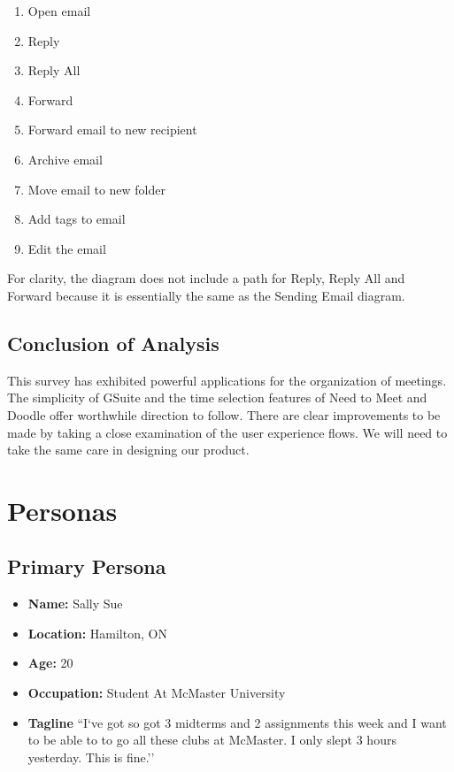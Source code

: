 \documentclass{sigchi}
\begin{document}
\begin{enumerate}
\item Open email
\item Reply
\item Reply All
\item Forward
\item Forward email to new recipient
\item Archive email
\item Move email to new folder
\item Add tags to email
\item Edit the email
\end{enumerate}

For clarity, the diagram does not include a path for Reply, Reply All and Forward because it is essentially the same as the Sending Email diagram.
\FloatBarrier
\subsection{Conclusion of Analysis}

This survey has exhibited powerful applications for the organization of meetings.
The simplicity of GSuite and the time selection features of Need to Meet and Doodle offer worthwhile direction to follow.
There are clear improvements to be made by taking a close examination of the user experience flows.
We will need to take the same care in designing our product.


\section{Personas}

\subsection{Primary Persona}
\begin{itemize}
	\item \textbf{Name:} Sally Sue
	\item \textbf{Location:} Hamilton, ON
	\item \textbf{Age:} 20
	\item \textbf{Occupation:} Student At McMaster University
	\item \textbf{Tagline} ``I`ve got so got 3 midterms and 2 assignments this week and I want to be able to to go all these clubs at McMaster. I only slept 3 hours yesterday. This is fine.''
\end{itemize}
\end{document}
